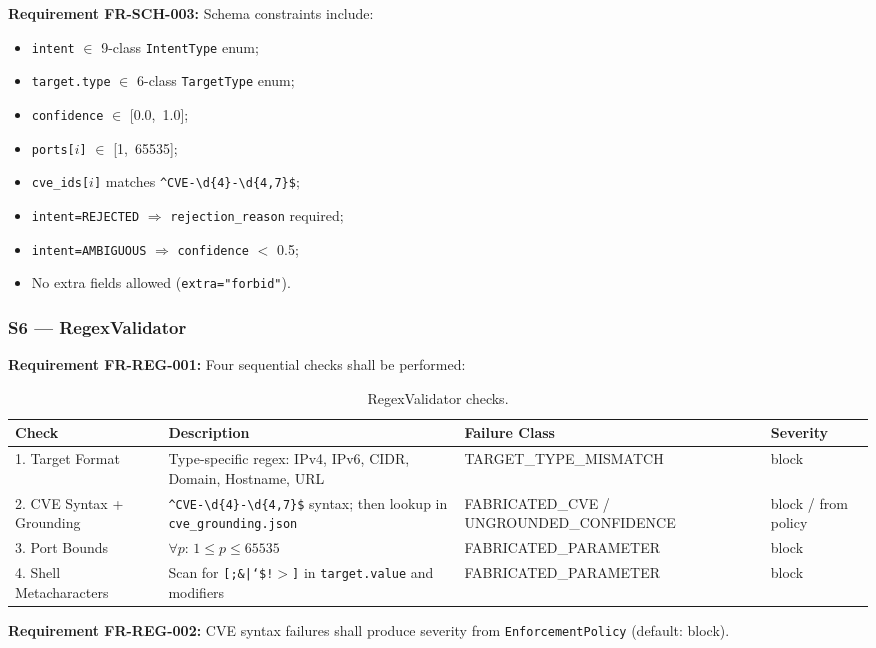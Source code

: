 \documentclass[10pt,journal,onecolumn]{IEEEtran}
\newcommand{\reqid}[1]{\textbf{#1}}
\begin{document}
\reqid{Requirement FR-SCH-003:} Schema constraints include:
\begin{itemize}
\item \texttt{intent} $\in$ 9-class \texttt{IntentType} enum;
\item \texttt{target.type} $\in$ 6-class \texttt{TargetType} enum;
\item \texttt{confidence} $\in$ [0.0,~1.0];
\item \texttt{ports[$i$]} $\in$ [1,~65535];
\item \texttt{cve\_ids[$i$]} matches \texttt{\^{}CVE-\textbackslash d\{4\}-\textbackslash d\{4,7\}\$};
\item \texttt{intent=REJECTED} $\Rightarrow$ \texttt{rejection\_reason} required;
\item \texttt{intent=AMBIGUOUS} $\Rightarrow$ \texttt{confidence} $<$ 0.5;
\item No extra fields allowed (\texttt{extra="forbid"}).
\end{itemize}

\subsubsection{S6 --- RegexValidator}
\reqid{Requirement FR-REG-001:} Four sequential checks shall be performed:
\begin{table}[t]
\caption{RegexValidator checks.}
\label{tab:regex}
\begin{tabularx}{\textwidth}{l X l l}
\toprule
\textbf{Check} & \textbf{Description} & \textbf{Failure Class} & \textbf{Severity}\\
\midrule
1. Target Format & Type-specific regex: IPv4, IPv6, CIDR, Domain, Hostname, URL & TARGET\_TYPE\_MISMATCH & block\\
2. CVE Syntax + Grounding & \texttt{\^{}CVE-\textbackslash d\{4\}-\textbackslash d\{4,7\}\$} syntax; then lookup in \texttt{cve\_grounding.json} & FABRICATED\_CVE / UNGROUNDED\_CONFIDENCE & block / from policy\\
3. Port Bounds & $\forall p$: $1 \leq p \leq 65535$ & FABRICATED\_PARAMETER & block\\
4. Shell Metacharacters & Scan for \texttt{[;\&|`\$!$>$]} in \texttt{target.value} and modifiers & FABRICATED\_PARAMETER & block\\
\bottomrule
\end{tabularx}
\end{table}

\reqid{Requirement FR-REG-002:} CVE syntax failures shall produce severity from \texttt{EnforcementPolicy} (default: block).
\end{document}
